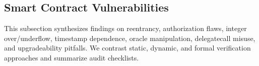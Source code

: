 \subsection{Smart Contract Vulnerabilities}
This subsection synthesizes findings on reentrancy, authorization flaws, integer over/underflow, timestamp dependence, oracle manipulation, delegatecall misuse, and upgradeability pitfalls. We contrast static, dynamic, and formal verification approaches and summarize audit checklists.



